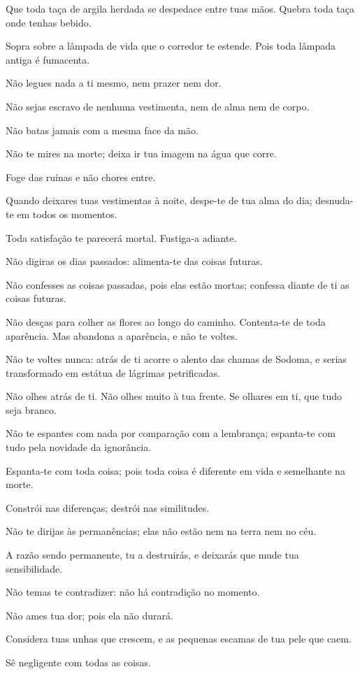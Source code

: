 Que toda taça de argila herdada se despedace entre tuas mãos. Quebra
toda taça onde tenhas bebido.

Sopra sobre a lâmpada de vida que o corredor te estende. Pois toda
lâmpada antiga é fumacenta.

Não legues nada a ti mesmo, nem prazer nem dor.

Não sejas escravo de nenhuma vestimenta, nem de alma nem de corpo.

Não batas jamais com a mesma face da mão.

Não te mires na morte; deixa ir tua imagem na água que corre.

Foge das ruínas e não chores entre.

Quando deixares tuas vestimentas à noite, despe-te de tua alma do dia;
desnuda-te em todos os momentos.

Toda satisfação te parecerá mortal. Fustiga-a adiante.

Não digiras os dias passados: alimenta-te das coisas futuras.

Não confesses as coisas passadas, pois elas estão mortas; confessa
diante de ti as coisas futuras.

Não desças para colher as flores ao longo do caminho. Contenta-te de
toda aparência. Mas abandona a aparência, e não te voltes.

Não te voltes nunca: atrás de ti acorre o alento das chamas de Sodoma,
e serias transformado em estátua de lágrimas petrificadas.

Não olhes atrás de ti. Não olhes muito à tua frente. Se olhares em ti,
que tudo seja branco.

Não te espantes com nada por comparação com a lembrança; espanta-te com
tudo pela novidade da ignorância.

Espanta-te com toda coisa; pois toda coisa é diferente em vida e
semelhante na morte.

Constrói nas diferenças; destrói nas similitudes.

Não te dirijas às permanências; elas não estão nem na terra nem no céu.

A razão sendo permanente, tu a destruirás, e deixarás que mude tua
sensibilidade.

Não temas te contradizer: não há contradição no momento.

Não ames tua dor; pois ela não durará.

Considera tuas unhas que crescem, e as pequenas escamas de tua pele que
caem.

Sê negligente com todas as coisas.

